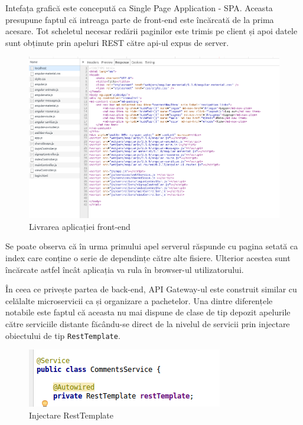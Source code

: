 \documentclass[12pt, a4paper, oneside, romanian]{teza-upb}
\begin{document}
Intefața grafică este concepută ca Single Page Application - SPA. Aceasta presupune faptul că intreaga parte de front-end este încărcată de la prima acesare. Tot scheletul necesar redării paginilor este trimis pe client și apoi datele sunt obținute prin apeluri REST către api-ul expus de server.

\begin{figure}[ht]
\centering
\includegraphics[scale=0.5]{img/spring-boot-spa-network.png}
\caption{Livrarea aplicației front-end}
\label{fig:arhi_componente}
\end{figure}

Se poate observa că în urma primului apel serverul răspunde cu pagina setată ca index care conține o serie de dependințe către alte fisiere. Ulterior acestea sunt încărcate astfel încât aplicația va rula în browser-ul utilizatorului. 	


\newpage
În ceea ce privește partea de back-end, API Gateway-ul este construit similar cu celălalte microservicii ca și organizare a pachetelor. Una dintre diferențele notabile este faptul că aceasta nu mai dispune de clase de tip depozit apelurile către serviciile distante făcându-se direct de la nivelul de servicii prin injectare obiectului de tip \texttt{RestTemplate}.

\begin{figure}[ht]
\centering
\includegraphics[scale=0.5]{img/spring-boot-service-resttemplate.png}
\caption{Injectare RestTemplate}
\label{fig:arhi_componente}
\end{figure}
\end{document}
